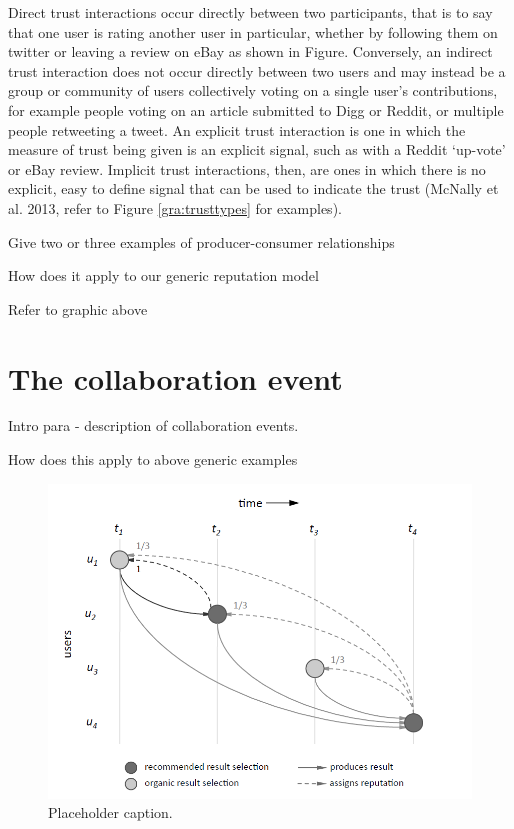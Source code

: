 \documentclass[]{final_report}
\begin{document}
Direct trust interactions occur directly between two participants, that is to say that one user is rating another user in particular, whether by following them on twitter or leaving a review on eBay as shown in Figure. Conversely, an indirect trust interaction does not occur directly between two users and may instead be a group or community of users collectively voting on a single user's contributions, for example people voting on an article submitted to Digg or Reddit, or multiple people retweeting a tweet. An explicit trust interaction is one in which the measure of trust being given is an explicit signal, such as with a Reddit `up-vote' or eBay review. Implicit trust interactions, then, are ones in which there is no explicit, easy to define signal that can be used to indicate the trust (McNally et al. 2013, refer to Figure \ref{gra:trusttypes} for examples).

Give two or three examples of producer-consumer relationships

How does it apply to our generic reputation model



Refer to graphic above

\section{The collaboration event}

Intro para - description of collaboration events.

How does this apply to above generic examples

\begin{figure}[ht!]
\centering
\includegraphics[width=140mm]{chap3/collabeventstime.png}
\caption{Placeholder caption.}
\end{figure}\label{gra:collabtime}
\end{document}
